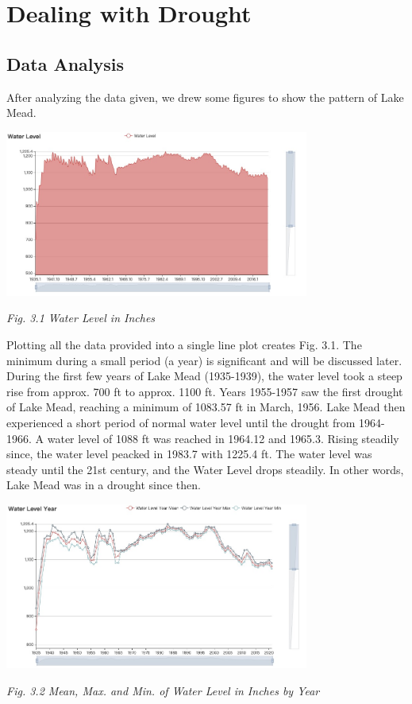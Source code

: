 \documentclass[12pt]{article}
\theoremstyle{definition}
\theoremstyle{remark}
\numberwithin{equation}{section}
\begin{document}
\newpage
\section{Dealing with Drought}

	\subsection{Data Analysis}
		After analyzing the data given, we drew some figures to show the pattern of Lake Mead.
		
		\begin{center}
		\includegraphics[width=10cm]{3.1 Water Level in Inches.jpg}

		\small \textit{Fig. 3.1 Water Level in Inches}
		\end{center}
		
		Plotting all the data provided into a single line plot creates Fig. 3.1. The minimum during a small period (a year) is significant and will be discussed later. During the first few years of Lake Mead (1935-1939), the water level took a steep rise from approx. 700 ft to approx. 1100 ft. Years 1955-1957 saw the first drought of Lake Mead, reaching a minimum of 1083.57 ft in March, 1956. Lake Mead then experienced a short period of normal water level until the drought from 1964-1966. A water level of 1088 ft was reached in 1964.12 and 1965.3. Rising steadily since, the water level peacked in 1983.7 with 1225.4 ft. The water level was steady until the 21st century, and the Water Level drops steadily. In other words, Lake Mead was in a drought since then.
		
		\begin{center}
		\includegraphics[width=10cm]{3.2 Mean, Max. and Min. of Water Level in Inches by Year.jpg}

		\small \textit{Fig. 3.2 Mean, Max. and Min. of Water Level in Inches by Year}
		\end{center}
		
\end{document}
